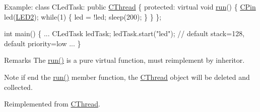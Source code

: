 \begin{DoxyCode}
Example:
        \textcolor{keyword}{class }CLedTask: \textcolor{keyword}{public} \hyperlink{class_c_thread}{CThread} \{
        \textcolor{keyword}{protected}:
            \textcolor{keyword}{virtual} \textcolor{keywordtype}{void} \hyperlink{class_c_debug_a9a3e40cc8ee5d0c2a41577f658779c71}{run}() \{
                \hyperlink{class_c_pin}{CPin} led(\hyperlink{group___enumerations_gga65a2241721e4acb573e0c3fe29ac432fa8379bbaa96d151e6adac488b2a147b7a}{LED2});
                \textcolor{keywordflow}{while}(1) \{
                    led = !led;
                    sleep(200);
                \}
            \}
        \};

        \textcolor{keywordtype}{int} main() \{
            ...
            CLedTask ledTask;
            ledTask.start(\textcolor{stringliteral}{"led"});   \textcolor{comment}{// default stack=128, default priority=low}
            ...
        \}
\end{DoxyCode}
 \begin{DoxyRemark}{Remarks}
The \hyperlink{class_c_debug_a9a3e40cc8ee5d0c2a41577f658779c71}{run()} is a pure virtual function, must reimplement by inheritor. 
\end{DoxyRemark}
\begin{DoxyNote}{Note}
if end the \hyperlink{class_c_debug_a9a3e40cc8ee5d0c2a41577f658779c71}{run()} member function, the \hyperlink{class_c_thread}{C\-Thread} object will be deleted and collected. 
\end{DoxyNote}


Reimplemented from \hyperlink{class_c_thread_a071c3d3b3c19a7bd6a01aca073a9b4d7}{C\-Thread}.



